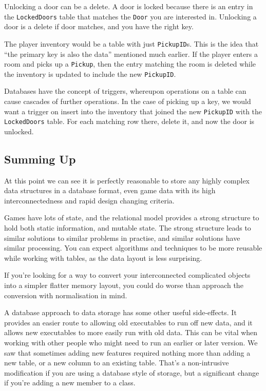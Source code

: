 \documentclass[a4paper,12pt]{article}
\begin{document}
Unlocking a door can be a delete.
A door is locked because there is an entry in the \texttt{LockedDoors} table that matches the \texttt{Door} you are interested in.
Unlocking a door is a delete if door matches, and you have the right key.

The player inventory would be a table with just \texttt{PickupID}s.
This is the idea that ``the primary key is also the data'' mentioned much earlier.
If the player enters a room and picks up a \texttt{Pickup}, then the entry matching the room is deleted while the inventory is updated to include the new \texttt{PickupID}.

Databases have the concept of triggers, whereupon operations on a table can cause cascades of further operations.
In the case of picking up a key, we would want a trigger on insert into the inventory that joined the new \texttt{PickupID} with the \texttt{LockedDoors} table.
For each matching row there, delete it, and now the door is unlocked.

\subsection{Summing Up}

At this point we can see it is perfectly reasonable to store any highly complex data structures in a database format, even game data with its high interconnectedness and rapid design changing criteria.

Games have lots of state, and the relational model provides a strong structure to hold both static information, and mutable state. The strong structure leads to similar solutions to similar problems in practise, and similar solutions have similar processing. You can expect algorithms and techniques to be more reusable while working with tables, as the data layout is less surprising.

If you're looking for a way to convert your interconnected complicated objects into a simpler flatter memory layout, you could do worse than approach the conversion with normalisation in mind.

A database approach to data storage has some other useful side-effects. It provides an easier route to allowing old executables to run off new data, and it allows new executables to more easily run with old data. This can be vital when working with other people who might need to run an earlier or later version. We saw that sometimes adding new features required nothing more than adding a new table, or a new column to an existing table. That's a non-intrusive modification if you are using a database style of storage, but a significant change if you're adding a new member to a class.
\end{document}
